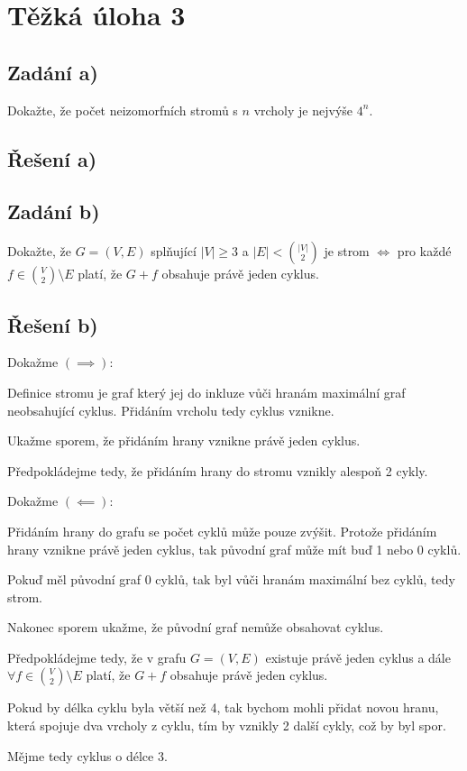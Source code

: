 \documentclass[../main.tex]{subfiles}
\begin{document}
\section{Těžká úloha 3}

\subsection{Zadání a)}
Dokažte, že počet neizomorfních stromů s $n$ vrcholy je nejvýše $4^n$.

\subsection{Řešení a)}




\subsection{Zadání b)}
Dokažte, že $G=(V,E)$ splňující $|V|\geq 3$ a $|E| < \binom{|V|}{2}$ je strom $\Leftrightarrow$ pro každé $f\in\binom{V}{2}\setminus E$ platí, že $G + f$ obsahuje právě jeden cyklus.
\subsection{Řešení b)}

Dokažme $(\implies)$: 

Definice stromu je graf který jej do inkluze vůči hranám maximální graf neobsahující cyklus. Přidáním vrcholu tedy cyklus vznikne.

Ukažme sporem, že přidáním hrany vznikne právě jeden cyklus. 

Předpokládejme tedy, že přidáním hrany do stromu vznikly alespoň 2 cykly. 

Dokažme $(\impliedby)$:

Přidáním hrany do grafu se počet cyklů může pouze zvýšit.
Protože přidáním hrany vznikne právě jeden cyklus, tak původní graf může mít buď 1 nebo 0 cyklů.

Pokuď měl původní graf 0 cyklů, tak byl vůči hranám maximální bez cyklů, tedy strom.

Nakonec sporem ukažme, že původní graf nemůže obsahovat cyklus.

Předpokládejme tedy, že v grafu $G=(V,E)$ existuje právě jeden cyklus a dále $\forall f\in \binom{V}{2}\setminus E$ platí, že $G+f$ obsahuje právě jeden cyklus.

Pokud by délka cyklu byla větší než 4, tak bychom mohli přidat novou hranu, která spojuje dva vrcholy z cyklu, tím by vznikly 2 další cykly, což by byl spor.

Mějme tedy cyklus o délce 3. 
\end{document}
